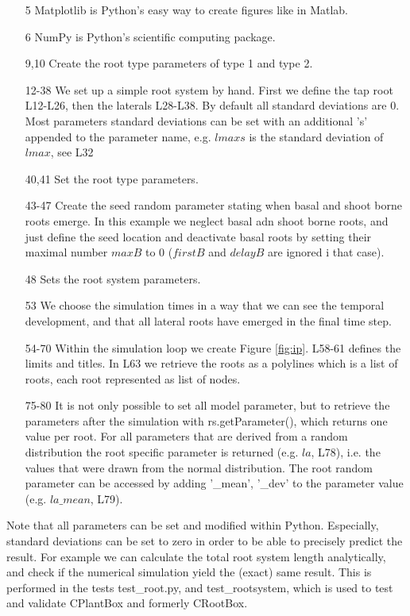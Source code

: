 \begin{itemize}
\item[5] Matplotlib is Python's easy way to create figures like in Matlab.\item[6] NumPy is Python's scientific computing package.

\item[9,10] Create the root type parameters of type 1 and type 2.
\item[12-38] We set up a simple root system by hand. First we define the tap root L12-L26, then the laterals L28-L38. By default all standard deviations are 0. Most parameters standard deviations can be set with an additional 's' appended to the parameter name, e.g. $lmaxs$ is the standard deviation of $lmax$, see L32
\item[40,41] Set the root type parameters.

\item[43-47] Create the seed random parameter stating when basal and shoot borne roots emerge. In this example we neglect basal adn shoot borne roots, and just define the seed location and deactivate basal roots by setting their maximal number $maxB$ to 0 ($firstB$ and $delayB$ are ignored i that case). 
\item[48] Sets the root system parameters.

\item[53] We choose the simulation times in a way that we can see the temporal development, and that all lateral roots have emerged in the final time step.

\item[54-70] Within the simulation loop we create Figure \ref{fig:ip}. L58-61 defines the limits and titles. In L63 we retrieve the roots as a polylines which is a list of roots, each root represented as list of nodes.

\item[75-80] It is not only possible to set all model parameter, 
but to retrieve the parameters after the simulation with rs.getParameter(), which returns one value per root. For all parameters that are derived from a random distribution the root specific parameter is returned (e.g. $la$, L78), i.e. the values that were drawn from the normal distribution. The root random parameter can be accessed by adding '\_mean', '\_dev' to the parameter value (e.g. $la\_mean$, L79).

\end{itemize}

Note that all parameters can be set and modified within Python. Especially, standard deviations can be set to zero in order to be able to precisely predict the result. For example we can calculate the total root system length analytically, and check if the numerical simulation yield the (exact) same result. This is performed in the tests test\_root.py, and test\_rootsystem, which is used to test and validate CPlantBox and formerly CRootBox.

